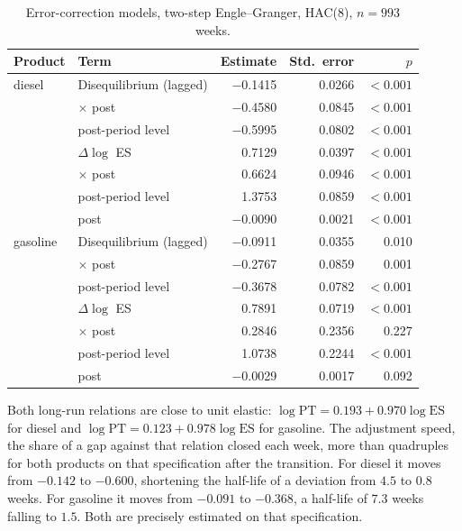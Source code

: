 \documentclass[11pt,a4paper]{article}
\begin{document}
\begin{table}[htbp]
\centering
\caption{Error-correction models, two-step Engle--Granger, HAC(8), $n=993$ weeks.}
\label{tab:ecm}
\begin{tabular}{llrrr}
\toprule
Product & Term & Estimate & Std.\ error & $p$ \\
\midrule
diesel & Disequilibrium (lagged) & $-$0.1415 & 0.0266 & $<0.001$ \\
 & \quad $\times$ post & $-$0.4580 & 0.0845 & $<0.001$ \\
 & \quad post-period level & $-$0.5995 & 0.0802 & $<0.001$ \\
 & $\Delta \log$ ES & 0.7129 & 0.0397 & $<0.001$ \\
 & \quad $\times$ post & 0.6624 & 0.0946 & $<0.001$ \\
 & \quad post-period level & 1.3753 & 0.0859 & $<0.001$ \\
 & post & $-$0.0090 & 0.0021 & $<0.001$ \\
\midrule
gasoline & Disequilibrium (lagged) & $-$0.0911 & 0.0355 & 0.010 \\
 & \quad $\times$ post & $-$0.2767 & 0.0859 & 0.001 \\
 & \quad post-period level & $-$0.3678 & 0.0782 & $<0.001$ \\
 & $\Delta \log$ ES & 0.7891 & 0.0719 & $<0.001$ \\
 & \quad $\times$ post & 0.2846 & 0.2356 & 0.227 \\
 & \quad post-period level & 1.0738 & 0.2244 & $<0.001$ \\
 & post & $-$0.0029 & 0.0017 & 0.092 \\
\bottomrule
\end{tabular}
\end{table}

Both long-run relations are close to unit elastic:
$\log \text{PT} = 0.193 + 0.970 \log \text{ES}$ for diesel and
$\log \text{PT} = 0.123 + 0.978 \log \text{ES}$ for gasoline. The adjustment speed, the share of
a gap against that relation closed each week, more than quadruples for both products on that
specification after the
transition. For diesel it moves from $-0.142$ to $-0.600$, shortening the half-life of a
deviation from $4.5$ to $0.8$ weeks. For gasoline it moves from $-0.091$ to $-0.368$, a
half-life of $7.3$ weeks falling to $1.5$. Both are precisely estimated on that specification.
\end{document}
